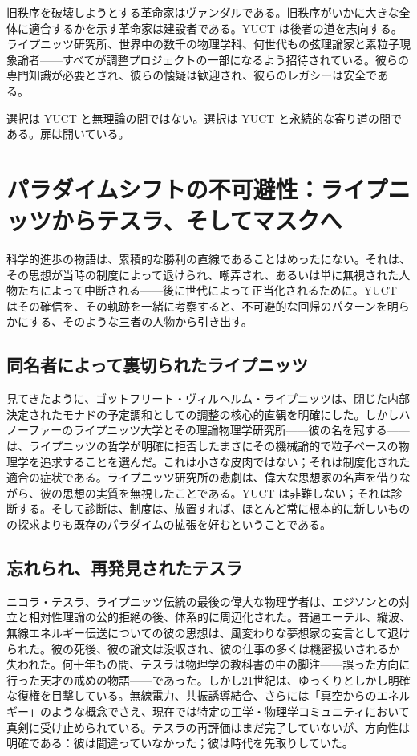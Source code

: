 \documentclass[12pt,a4paper]{article}
\begin{document}
	旧秩序を破壊しようとする革命家はヴァンダルである。旧秩序がいかに大きな全体に適合するかを示す革命家は建設者である。YUCT は後者の道を志向する。ライプニッツ研究所、世界中の数千の物理学科、何世代もの弦理論家と素粒子現象論者——すべてが調整プロジェクトの一部になるよう招待されている。彼らの専門知識が必要とされ、彼らの懐疑は歓迎され、彼らのレガシーは安全である。
	
	選択は YUCT と無理論の間ではない。選択は YUCT と永続的な寄り道の間である。扉は開いている。
	
	\section{パラダイムシフトの不可避性：ライプニッツからテスラ、そしてマスクへ}
	
	科学的進歩の物語は、累積的な勝利の直線であることはめったにない。それは、その思想が当時の制度によって退けられ、嘲弄され、あるいは単に無視された人物たちによって中断される——後に世代によって正当化されるために。YUCT はその確信を、その軌跡を一緒に考察すると、不可避的な回帰のパターンを明らかにする、そのような三者の人物から引き出す。
	
	\subsection{同名者によって裏切られたライプニッツ}
	
	見てきたように、ゴットフリート・ヴィルヘルム・ライプニッツは、閉じた内部決定されたモナドの予定調和としての調整の核心的直観を明確にした。しかしハノーファーのライプニッツ大学とその理論物理学研究所——彼の名を冠する——は、ライプニッツの哲学が明確に拒否したまさにその機械論的で粒子ベースの物理学を追求することを選んだ。これは小さな皮肉ではない；それは制度化された適合の症状である。ライプニッツ研究所の悲劇は、偉大な思想家の名声を借りながら、彼の思想の実質を無視したことである。YUCT は非難しない；それは診断する。そして診断は、制度は、放置すれば、ほとんど常に根本的に新しいものの探求よりも既存のパラダイムの拡張を好むということである。
	
	\subsection{忘れられ、再発見されたテスラ}
	
	ニコラ・テスラ、ライプニッツ伝統の最後の偉大な物理学者は、エジソンとの対立と相対性理論の公的拒絶の後、体系的に周辺化された。普遍エーテル、縦波、無線エネルギー伝送についての彼の思想は、風変わりな夢想家の妄言として退けられた。彼の死後、彼の論文は没収され、彼の仕事の多くは機密扱いされるか失われた。何十年もの間、テスラは物理学の教科書の中の脚注——誤った方向に行った天才の戒めの物語——であった。しかし21世紀は、ゆっくりとしかし明確な復権を目撃している。無線電力、共振誘導結合、さらには「真空からのエネルギー」のような概念でさえ、現在では特定の工学・物理学コミュニティにおいて真剣に受け止められている。テスラの再評価はまだ完了していないが、方向性は明確である：彼は間違っていなかった；彼は時代を先取りしていた。
	
\end{document}
